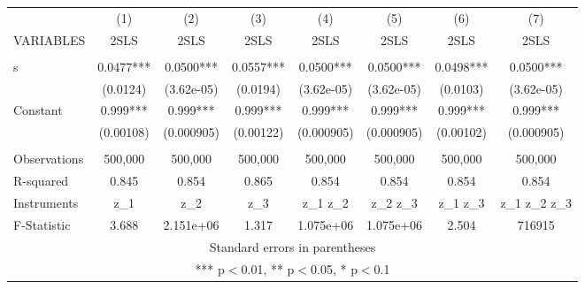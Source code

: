 \begin{tabular}{lccccccc} \hline
 & (1) & (2) & (3) & (4) & (5) & (6) & (7) \\
VARIABLES & 2SLS & 2SLS & 2SLS & 2SLS & 2SLS & 2SLS & 2SLS \\ \hline
 &  &  &  &  &  &  &  \\
s & 0.0477*** & 0.0500*** & 0.0557*** & 0.0500*** & 0.0500*** & 0.0498*** & 0.0500*** \\
 & (0.0124) & (3.62e-05) & (0.0194) & (3.62e-05) & (3.62e-05) & (0.0103) & (3.62e-05) \\
Constant & 0.999*** & 0.999*** & 0.999*** & 0.999*** & 0.999*** & 0.999*** & 0.999*** \\
 & (0.00108) & (0.000905) & (0.00122) & (0.000905) & (0.000905) & (0.00102) & (0.000905) \\
 &  &  &  &  &  &  &  \\
Observations & 500,000 & 500,000 & 500,000 & 500,000 & 500,000 & 500,000 & 500,000 \\
R-squared & 0.845 & 0.854 & 0.865 & 0.854 & 0.854 & 0.854 & 0.854 \\
Instruments & z\_1 & z\_2 & z\_3 & z\_1 z\_2 & z\_2 z\_3 & z\_1 z\_3 & z\_1 z\_2 z\_3 \\
 F-Statistic & 3.688 & 2.151e+06 & 1.317 & 1.075e+06 & 1.075e+06 & 2.504 & 716915 \\ \hline
\multicolumn{8}{c}{ Standard errors in parentheses} \\
\multicolumn{8}{c}{ *** p$<$0.01, ** p$<$0.05, * p$<$0.1} \\
\end{tabular}
